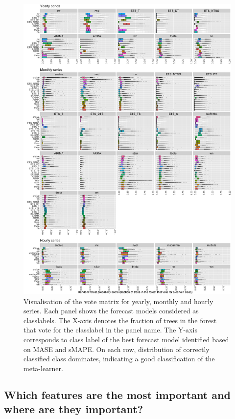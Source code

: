 \documentclass[11pt,a4paper,]{article}
\begin{document}
\begin{figure}[h]

{\centering \includegraphics[width=\textwidth]{figure/yearlyoob-1} 

}

\caption{Visualisation of the vote matrix for yearly, monthly and hourly series. Each panel shows the forecast models considered as classlabels. The X-axis denotes the fraction of trees in the forest that vote for the classlabel in the panel name. The Y-axis corresponds to class label of the best forecast model identified based on MASE and sMAPE. On each row, distribution of correctly classified class dominates, indicating a good classification of the meta-learner.}\label{fig:yearlyoob}
\end{figure}

\clearpage

\hypertarget{which-features-are-the-most-important-and-where-are-they-important}{%
\subsection{Which features are the most important and where are they important?}\label{which-features-are-the-most-important-and-where-are-they-important}}
\end{document}
